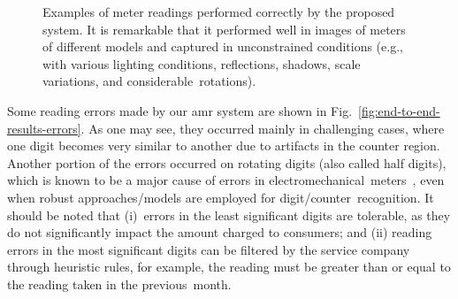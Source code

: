 \begin{figure*}[!htb]
	\vspace{-1.1mm}

    \caption{\small Examples of meter readings performed correctly by the proposed system.
    It is remarkable that it performed well in images of meters of different models and captured in unconstrained conditions (e.g., with various lighting conditions, reflections, shadows, scale variations, and considerable~rotations).}
    \label{fig:end-to-end-results-correct}  
\end{figure*}

Some reading errors made by our \gls*{amr} system are shown in Fig.~\ref{fig:end-to-end-results-errors}.
As one may see, they occurred mainly in challenging cases, where one digit becomes very similar to another due to artifacts in the counter region.
Another portion of the errors occurred on rotating digits (also called half digits), which is known to be a major cause of errors in electromechanical~meters~\cite{gao2018automatic,laroca2019convolutional}, even when robust approaches/models are employed for digit/counter~recognition.
It should be noted that (i)~errors in the least significant digits are tolerable, as they do not significantly impact the amount charged to consumers; and (ii) reading errors in the most significant digits can be filtered by the service company through heuristic rules, for example, the reading must be greater than or equal to the reading taken in the previous~month.

